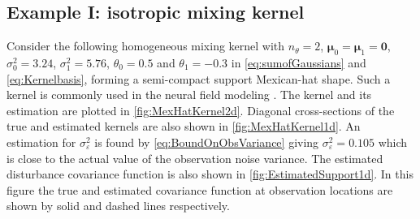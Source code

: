 \documentclass[10pt,twocolumn,twoside]{IEEEtran}
\begin{document}
\subsection{Example I: isotropic mixing kernel}
 Consider the following homogeneous mixing kernel with $n_\theta=2$, $\boldsymbol\mu_0=\boldsymbol\mu_1=\mathbf 0$, $\sigma_0^2=3.24$, $\sigma_1^2=5.76$, $\theta_0=0.5$ and $\theta_1=-0.3$ in \eqref{eq:sumofGaussians} and \eqref{eq:Kernelbasis}, forming a semi-compact support Mexican-hat shape. Such a kernel is commonly used in the neural field modeling \cite{Amari1977,Atay2005,Breakspear2010}. The kernel and its estimation are plotted in \figurename{\ref{fig:MexHatKernel2d}}. Diagonal cross-sections of the true and estimated kernels are also shown in \figurename{\ref{fig:MexHatKernel1d}}. An estimation for $\sigma_{\varepsilon}^2$ is found by \eqref{eq:BoundOnObsVariance} giving $\sigma_{\varepsilon}^2=0.105$ which is close to the actual value of the observation noise variance. The estimated disturbance covariance function is also shown in \figurename{\ref{fig:EstimatedSupport1d}}. In this figure the true and estimated covariance function at observation locations are shown by solid and dashed lines respectively.
 
\end{document}
